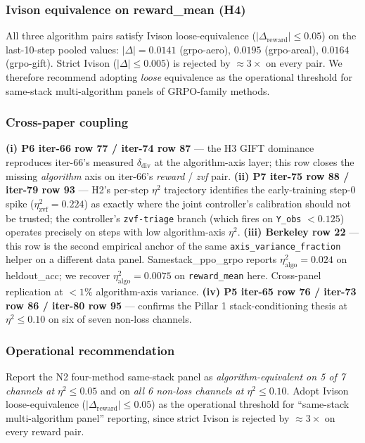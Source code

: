 \subsubsection{Ivison equivalence on reward\_mean (H4)}
\label{sec:p5-iter85-h4}
All three algorithm pairs satisfy Ivison loose-equivalence
($|\Delta_{\mathrm{reward}}| \le 0.05$) on the last-10-step pooled
values: $|\Delta| = 0.0141$ (grpo-aero), $0.0195$ (grpo-areal),
$0.0164$ (grpo-gift). Strict Ivison ($|\Delta| \le 0.005$) is rejected
by $\approx 3\times$ on every pair. We therefore recommend adopting
\emph{loose} equivalence as the operational threshold for same-stack
multi-algorithm panels of GRPO-family methods.

\subsubsection{Cross-paper coupling}
\label{sec:p5-iter85-coupling}
\textbf{(i) P6 iter-66 row 77 / iter-74 row 87} --- the H3 GIFT
dominance reproduces iter-66's measured $\delta_{\mathrm{div}}$ at the
algorithm-axis layer; this row closes the missing \emph{algorithm}
axis on iter-66's \emph{reward} / \emph{zvf} pair.
\textbf{(ii) P7 iter-75 row 88 / iter-79 row 93} --- H2's per-step
$\eta^2$ trajectory identifies the early-training step-0 spike
($\eta^2_{\mathrm{zvf}} = 0.224$) as exactly where the joint
controller's calibration should not be trusted; the controller's
\texttt{zvf-triage} branch (which fires on \texttt{Y\_obs} $< 0.125$)
operates precisely on steps with low algorithm-axis $\eta^2$.
\textbf{(iii) Berkeley row 22} --- this row is the second empirical
anchor of the same \texttt{axis\_variance\_fraction} helper on a
different data panel. Samestack\_ppo\_grpo reports
$\eta^2_{\mathrm{algo}} = 0.024$ on heldout\_acc; we recover
$\eta^2_{\mathrm{algo}} = 0.0075$ on \texttt{reward\_mean} here.
Cross-panel replication at $<1\%$ algorithm-axis variance.
\textbf{(iv) P5 iter-65 row 76 / iter-73 row 86 / iter-80 row 95} ---
confirms the Pillar 1 stack-conditioning thesis at $\eta^2 \le 0.10$
on six of seven non-loss channels.

\subsubsection{Operational recommendation}
\label{sec:p5-iter85-op}
Report the N2 four-method same-stack panel as
\emph{algorithm-equivalent on 5 of 7 channels at $\eta^2 \le 0.05$}
and on \emph{all 6 non-loss channels at $\eta^2 \le 0.10$}.
Adopt Ivison loose-equivalence ($|\Delta_{\mathrm{reward}}| \le 0.05$)
as the operational threshold for ``same-stack multi-algorithm panel''
reporting, since strict Ivison is rejected by $\approx 3\times$ on
every reward pair.